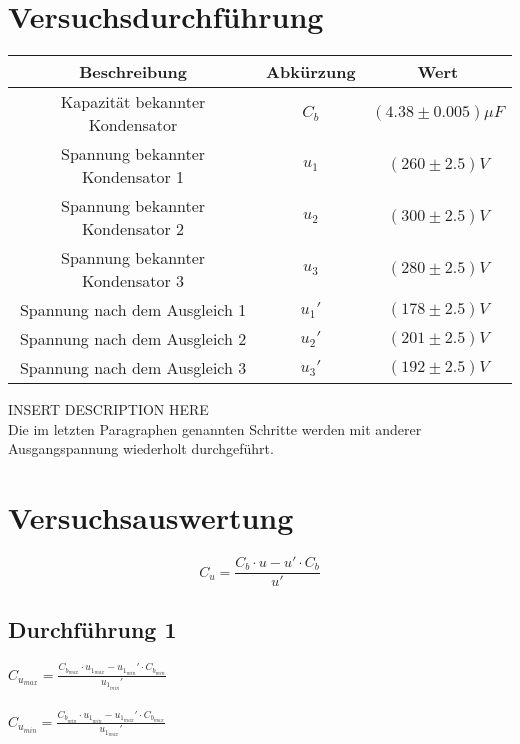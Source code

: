 \documentclass[a4paper,12pt]{article}
\begin{document}
\section{Versuchsdurchführung}
\begin{table}[H]
    \centering
    \begin{tabular}{|c|c|c|}
        \hline
        \textbf{Beschreibung} & \textbf{Abkürzung} & \textbf{Wert} \\
        \hline
        Kapazität bekannter Kondensator & $C_{b}$ & $(4.38\pm 0.005 )\mu F$\\
        \hline
        Spannung bekannter Kondensator 1 & $u_{1}$ & $(260\pm 2.5)V$\\
        Spannung bekannter Kondensator 2 & $u_{2}$ & $(300\pm 2.5)V$\\
        Spannung bekannter Kondensator 3 & $u_{3}$ & $(280\pm 2.5)V$\\
        \hline
        Spannung nach dem Ausgleich 1 & $u_{1}'$ & $(178\pm 2.5)V$\\
        Spannung nach dem Ausgleich 2 & $u_{2}'$ & $(201\pm 2.5)V$\\
        Spannung nach dem Ausgleich 3 & $u_{3}'$ & $(192\pm 2.5)V$\\
        \hline
    \end{tabular}
\end{table}

INSERT DESCRIPTION HERE\\

Die im letzten Paragraphen genannten Schritte werden mit anderer Ausgangspannung wiederholt durchgeführt.
\section{Versuchsauswertung}

$$C_u = \frac{C_b \cdot u - u' \cdot C_b}{u'}$$

\subsection{Durchführung 1}

$C_{u_{max}} = \displaystyle{\frac{C_{b_{max}}\cdot u_{1_{max}}-u_{1_{min}}'\cdot C_{b_{min}}}{u_{1_{min}}'}}$\\\\

$C_{u_{min}} = \displaystyle{\frac{C_{b_{min}}\cdot u_{1_{min}}-u_{1_{max}}'\cdot C_{b_{max}}}{u_{1_{max}}'}}$\\\\
\end{document}
